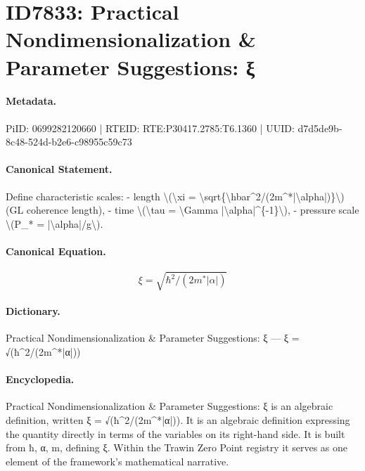 \section*{ID7833: Practical Nondimensionalization \& Parameter Suggestions: ξ}
\paragraph{Metadata.}
PiID: 0699282120660 | RTEID: RTE:P30417.2785:T6.1360 | UUID: d7d5de9b-8c48-524d-b2e6-c98955c59c73

\paragraph{Canonical Statement.}
Define characteristic scales: - length \textbackslash{}(\textbackslash{}xi = \textbackslash{}sqrt\{\textbackslash{}hbar\textasciicircum{}2/(2m\textasciicircum{}*|\textbackslash{}alpha|)\}\textbackslash{}) (GL coherence length), - time \textbackslash{}(\textbackslash{}tau = \textbackslash{}Gamma |\textbackslash{}alpha|\textasciicircum{}\{-1\}\textbackslash{}), - pressure scale \textbackslash{}(P\_* = |\textbackslash{}alpha|/g\textbackslash{}).

\paragraph{Canonical Equation.}
\[
\xi = \sqrt{\hbar^2/(2m^*|\alpha|)}
\]

\paragraph{Dictionary.}
Practical Nondimensionalization \& Parameter Suggestions: ξ — ξ = √(ħ\textasciicircum{}2/(2m\textasciicircum{}*|α|))

\paragraph{Encyclopedia.}
Practical Nondimensionalization \& Parameter Suggestions: ξ is an algebraic definition, written ξ = √(ħ\textasciicircum{}2/(2m\textasciicircum{}*|α|)). It is an algebraic definition expressing the quantity directly in terms of the variables on its right-hand side. It is built from ħ, α, m, defining ξ. Within the Trawin Zero Point registry it serves as one element of the framework's mathematical narrative.
